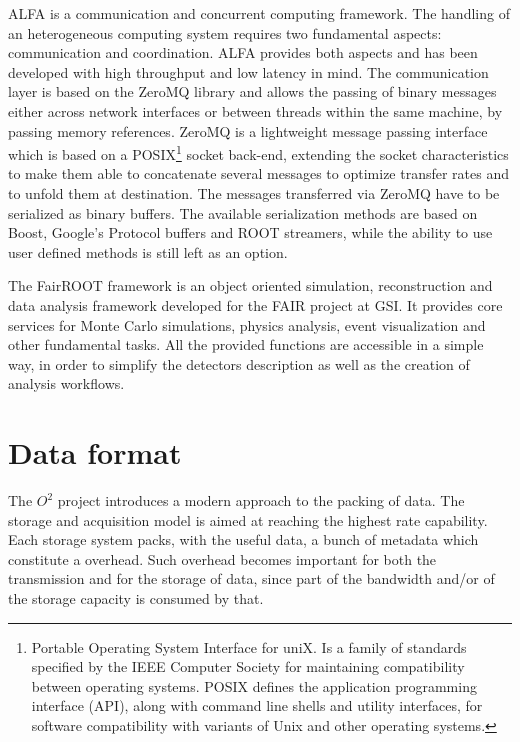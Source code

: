 ALFA is a communication and concurrent computing framework.
The handling of an heterogeneous computing system requires two fundamental aspects: communication and coordination.
ALFA provides both aspects and has been developed with high throughput and low latency in mind.
The communication layer is based on the ZeroMQ \cite{zeroMQ} library and allows the passing of binary messages either across network interfaces or between threads within the same machine, by passing memory references.
ZeroMQ is a lightweight message passing interface which is based on a POSIX\footnote{Portable Operating System Interface for uniX. Is a family of standards specified by the IEEE Computer Society for maintaining compatibility between operating systems. POSIX defines the application programming interface (API), along with command line shells and utility interfaces, for software compatibility with variants of Unix and other operating systems.} socket back-end, extending the socket characteristics to make them able to concatenate several messages to optimize transfer rates and to unfold them at destination.
The messages transferred via ZeroMQ have to be serialized as binary buffers.
The available serialization methods are based on Boost, Google's Protocol buffers \cite{googlepb} and ROOT streamers, while the ability to use user defined methods is still left as an option.

The FairROOT framework is an object oriented simulation, reconstruction and data analysis framework  developed for the FAIR project at GSI.
It provides core services for Monte Carlo simulations, physics analysis, event visualization and other fundamental tasks.
All the provided functions are accessible in a simple way, in order to simplify the detectors description as well as the creation of analysis workflows.

\section{Data format}
The $O^2$ project introduces a modern approach to the packing of data.
The storage and acquisition model is aimed at reaching the highest rate capability.
Each storage system packs, with the useful data, a bunch of metadata which constitute a overhead.
Such overhead becomes important for both the transmission and for the storage of data, since part of the bandwidth and/or of the storage capacity is consumed by that.

